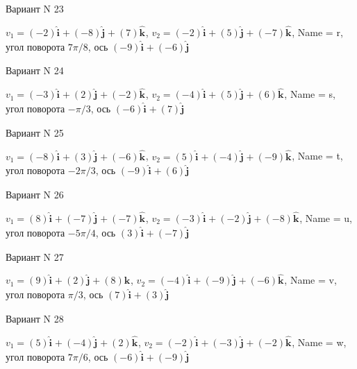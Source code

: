 \documentclass[11pt]{report}
\begin{document}
Вариант N 23

$v_1 = \left(-2\right)\mathbf{\hat{i}_{}} + \left(-8\right)\mathbf{\hat{j}_{}} + \left(7\right)\mathbf{\hat{k}_{}}$, $v_2 = \left(-2\right)\mathbf{\hat{i}_{}} + \left(5\right)\mathbf{\hat{j}_{}} + \left(-7\right)\mathbf{\hat{k}_{}}$, Name = r, угол поворота $7 \pi / 8$, ось $\left(-9\right)\mathbf{\hat{i}_{}} + \left(-6\right)\mathbf{\hat{j}_{}}$

Вариант N 24

$v_1 = \left(-3\right)\mathbf{\hat{i}_{}} + \left(2\right)\mathbf{\hat{j}_{}} + \left(-2\right)\mathbf{\hat{k}_{}}$, $v_2 = \left(-4\right)\mathbf{\hat{i}_{}} + \left(5\right)\mathbf{\hat{j}_{}} + \left(6\right)\mathbf{\hat{k}_{}}$, Name = s, угол поворота $- \pi / 3$, ось $\left(-6\right)\mathbf{\hat{i}_{}} + \left(7\right)\mathbf{\hat{j}_{}}$

Вариант N 25

$v_1 = \left(-8\right)\mathbf{\hat{i}_{}} + \left(3\right)\mathbf{\hat{j}_{}} + \left(-6\right)\mathbf{\hat{k}_{}}$, $v_2 = \left(5\right)\mathbf{\hat{i}_{}} + \left(-4\right)\mathbf{\hat{j}_{}} + \left(-9\right)\mathbf{\hat{k}_{}}$, Name = t, угол поворота $- 2 \pi / 3$, ось $\left(-9\right)\mathbf{\hat{i}_{}} + \left(6\right)\mathbf{\hat{j}_{}}$

Вариант N 26

$v_1 = \left(8\right)\mathbf{\hat{i}_{}} + \left(-7\right)\mathbf{\hat{j}_{}} + \left(-7\right)\mathbf{\hat{k}_{}}$, $v_2 = \left(-3\right)\mathbf{\hat{i}_{}} + \left(-2\right)\mathbf{\hat{j}_{}} + \left(-8\right)\mathbf{\hat{k}_{}}$, Name = u, угол поворота $- 5 \pi / 4$, ось $\left(3\right)\mathbf{\hat{i}_{}} + \left(-7\right)\mathbf{\hat{j}_{}}$

Вариант N 27

$v_1 = \left(9\right)\mathbf{\hat{i}_{}} + \left(2\right)\mathbf{\hat{j}_{}} + \left(8\right)\mathbf{\hat{k}_{}}$, $v_2 = \left(-4\right)\mathbf{\hat{i}_{}} + \left(-9\right)\mathbf{\hat{j}_{}} + \left(-6\right)\mathbf{\hat{k}_{}}$, Name = v, угол поворота $\pi / 3$, ось $\left(7\right)\mathbf{\hat{i}_{}} + \left(3\right)\mathbf{\hat{j}_{}}$

Вариант N 28

$v_1 = \left(5\right)\mathbf{\hat{i}_{}} + \left(-4\right)\mathbf{\hat{j}_{}} + \left(2\right)\mathbf{\hat{k}_{}}$, $v_2 = \left(-2\right)\mathbf{\hat{i}_{}} + \left(-3\right)\mathbf{\hat{j}_{}} + \left(-2\right)\mathbf{\hat{k}_{}}$, Name = w, угол поворота $7 \pi / 6$, ось $\left(-6\right)\mathbf{\hat{i}_{}} + \left(-9\right)\mathbf{\hat{j}_{}}$
\end{document}
